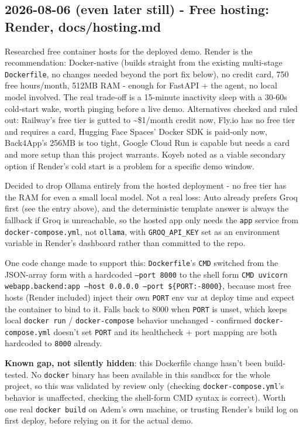 \subsection*{2026-08-06 (even later still) - Free hosting: Render, docs/hosting.md}
Researched free container hosts for the deployed demo. Render is the recommendation: Docker-native (builds straight from the existing multi-stage \texttt{Dockerfile}, no changes needed beyond the port fix below), no credit card, 750 free hours/month, 512MB RAM - enough for FastAPI + the agent, no local model involved. The real trade-off is a 15-minute inactivity sleep with a 30-60s cold-start wake, worth pinging before a live demo. Alternatives checked and ruled out: Railway's free tier is gutted to \textasciitilde{}\$1/month credit now, Fly.io has no free tier and requires a card, Hugging Face Spaces' Docker SDK is paid-only now, Back4App's 256MB is too tight, Google Cloud Run is capable but needs a card and more setup than this project warrants. Koyeb noted as a viable secondary option if Render's cold start is a problem for a specific demo window.

Decided to drop Ollama entirely from the hosted deployment - no free tier has the RAM for even a small local model. Not a real loss: Auto already prefers Groq first (see the entry above), and the deterministic template answer is always the fallback if Groq is unreachable, so the hosted app only needs the \texttt{app} service from \texttt{docker-compose.yml}, not \texttt{ollama}, with \texttt{GROQ\_\allowbreak{}API\_\allowbreak{}KEY} set as an environment variable in Render's dashboard rather than committed to the repo.

One code change made to support this: \texttt{Dockerfile}'s \texttt{CMD} switched from the JSON-array form with a hardcoded \texttt{--port 8000} to the shell form \texttt{CMD uvicorn webapp.backend:app --host 0.0.0.0 --port \$\{PORT:-8000\}}, because most free hosts (Render included) inject their own \texttt{PORT} env var at deploy time and expect the container to bind to it. Falls back to 8000 when \texttt{PORT} is unset, which keeps local \texttt{docker run} / \texttt{docker-compose} behavior unchanged - confirmed \texttt{docker-compose.yml} doesn't set \texttt{PORT} and its healthcheck + port mapping are both hardcoded to \texttt{8000} already.

\textbf{Known gap, not silently hidden}: this Dockerfile change hasn't been build-tested. No \texttt{docker} binary has been available in this sandbox for the whole project, so this was validated by review only (checking \texttt{docker-compose.yml}'s behavior is unaffected, checking the shell-form CMD syntax is correct). Worth one real \texttt{docker build} on Adem's own machine, or trusting Render's build log on first deploy, before relying on it for the actual demo.

